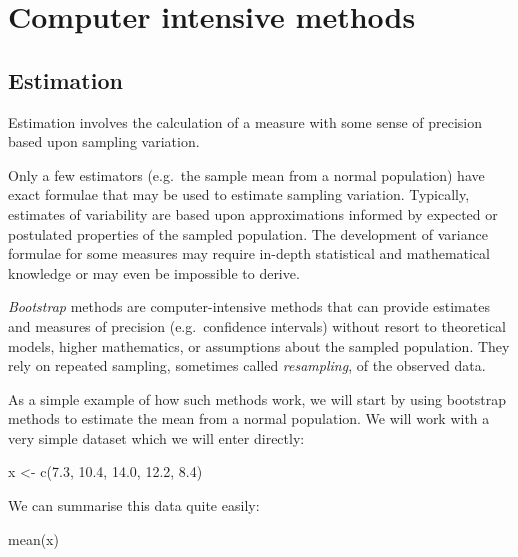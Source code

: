 \documentclass[
  12pt,
  a4paper]{book}
\newenvironment{Shaded}{\begin{snugshade}}{\end{snugshade}}
\newcommand{\FloatTok}[1]{\textcolor[rgb]{0.00,0.00,0.81}{#1}}
\newcommand{\FunctionTok}[1]{\textcolor[rgb]{0.00,0.00,0.00}{#1}}
\newcommand{\NormalTok}[1]{#1}
\newcommand{\OtherTok}[1]{\textcolor[rgb]{0.56,0.35,0.01}{#1}}
\begin{document}
\hypertarget{exercise9}{%
\chapter{Computer intensive methods}\label{exercise9}}

\hypertarget{estimation}{%
\section{Estimation}\label{estimation}}

Estimation involves the calculation of a measure with some sense of precision based upon sampling variation.

Only a few estimators (e.g.~the sample mean from a normal population) have exact formulae that may be used to estimate sampling variation. Typically, estimates of variability are based upon approximations informed by expected or postulated properties of the sampled population. The development of variance formulae for some measures may require in-depth statistical and mathematical knowledge or may even be impossible to derive.

\emph{Bootstrap} methods are computer-intensive methods that can provide estimates and measures of precision (e.g.~confidence intervals) without resort to theoretical models, higher mathematics, or assumptions about the sampled population. They rely on repeated sampling, sometimes called \emph{resampling}, of the observed data.

As a simple example of how such methods work, we will start by using bootstrap methods to estimate the mean from a normal population. We will work with a very simple dataset which we will enter directly:

\begin{Shaded}
\begin{Highlighting}[]
\NormalTok{x }\OtherTok{\textless{}{-}} \FunctionTok{c}\NormalTok{(}\FloatTok{7.3}\NormalTok{, }\FloatTok{10.4}\NormalTok{, }\FloatTok{14.0}\NormalTok{, }\FloatTok{12.2}\NormalTok{, }\FloatTok{8.4}\NormalTok{)}
\end{Highlighting}
\end{Shaded}

We can summarise this data quite easily:

\begin{Shaded}
\begin{Highlighting}[]
\FunctionTok{mean}\NormalTok{(x)}
\end{Highlighting}
\end{Shaded}
\end{document}
